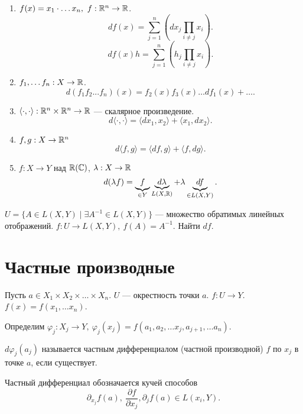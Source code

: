 \begin{prop}
    $ $
    \begin{enumerate}[noitemsep,label={\rm\bf \arabic*)}]
	\item $ f(x) = x_1 \cdot \ldots x_{n}, ~ f: \mathbb{R}^{n} \to  \mathbb{R}$.
	    \[
		df(x) = \sum_{j=1}^{n} \left(dx_j \prod_{i \ne j} x_i\right)
	    .\] 
	    \[
		df(x)h = \sum_{j=1}^{n} \left(h_j \prod_{i \ne j} x_i\right)
	    .\] 
	\item $ f_1, \ldots f_n: X \to  \mathbb{R}$.
	    \[
		d(f_1f_2...f_n) (x)= f_2(x)f_3(x) \ldots df_1(x) + \ldots 
	    .\] 
	\item $ \langle \cdot , \cdot  \rangle: \mathbb{R}^{n}  \times   \mathbb{R}^{n}  \to  \mathbb{R}$ --- скалярное произведение.
	    \[
	    d \langle \cdot , \cdot  \rangle = \langle dx_1, x_2 \rangle + \langle x_1, dx_2 \rangle
	    .\] 
	\item $ f, g: X \to  \mathbb{R}^{n} $
	    \[
	    d \langle f, g \rangle = \langle df, g \rangle  + \langle f, dg \rangle
	    .\] 
	\item $ f: X \to  Y$ над $ \mathbb{R}(\mathbb{C})$, $\lambda : X \to  \mathbb{R}$
\[
    d(\lambda f) = \underbrace{f}_{ \in  Y} \underbrace{d \lambda}_{L(X, \mathbb{R})} + {\lambda}  \underbrace{df}_{ \in L(X, Y)}
.\] 
    \end{enumerate}
\end{prop}
\begin{prac}
    $ U = \{A \in L(X, Y) \mid \exists A^{-1} \in  L(X, Y)\}$ --- множество обратимых линейных отображений.
    $ f: U \to  L(X, Y), ~ f(A) = A^{-1}$. Найти $ df$.
\end{prac}

\section{Частные производные}
\begin{defn}
    Пусть $ a \in  X_1 \times X_2 \times  \ldots  \times X_n$. $ U$ --- окрестность точки $ a$.  $ f\colon  U \to Y$.  $ f(x) = f(x_1, \ldots x_{n})$.

    Определим $ \varphi _j \colon  X_j \to  Y, ~ \varphi _j(x_j) = f(a_1, a_2, \ldots x_j, a_{j+1}, \ldots a_n)$.

    $ d \varphi _j (a_j)$ называется {\sf частным дифференциалом (частной производной)} $ f$ по $ x_j$ в точке $ a$, если существует. 
\end{defn}
\begin{name}
    Частный дифференциал обозначается кучей способов
    \[
	\partial_{x_j}f(a), ~ \frac{ \partial f}{ \partial x_j}, \partial_j f(a) \in L(x_i, Y)
    .\] 
\end{name}

% 
